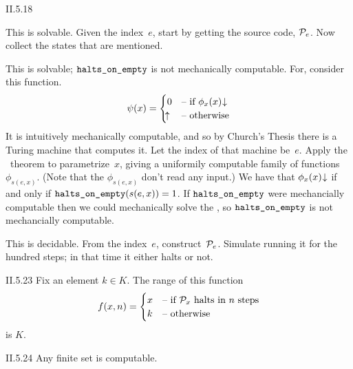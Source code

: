 \begin{ans}{II.5.18}
\begin{exparts}
\item This is solvable.
Given the index~$e$, start by getting the source code, $\mathcal{P}_e$.
Now collect the states that are mentioned.
\item This is solvable; $\operatorname{\texttt{halts\_on\_empty}}$
is not mechanically computable.
For, consider this function.
\begin{equation*}
  \psi(x)=
  \begin{cases}
    0          &\case{if $\phi_x(x)\converges$} \\
    \diverges &\case{otherwise}
  \end{cases}
\end{equation*}
It is intuitively mechanically computable, and so by Church's Thesis
there is a Turing machine that computes it.
Let the index of that machine be~$e$.
Apply the \smn~theorem to parametrize~$x$,
giving a uniformily computable family of functions~$\phi_{s(e,x)}$.
(Note that the $\phi_{s(e,x)}$ don't read any input.)
We have that $\phi_x(x)\converges$ if and only if
$\operatorname{\texttt{halts\_on\_empty}}(s(e,x))=1$.
If $\operatorname{\texttt{halts\_on\_empty}}$ were mechancially computable
then we could mechanically solve the \HP,
so $\operatorname{\texttt{halts\_on\_empty}}$ is not mechancially computable.
\item This is decidable.
From the index~$e$, construct~$\mathcal{P}_e$.
Simulate running it for the hundred steps; in that time it either halts
or not.
\end{exparts}
\end{ans}
%
%
%
%
%
\begin{ans}{II.5.23}
Fix an element $k\in K$.
The range of this function
\begin{equation*}
  f(x,n)=
  \begin{cases}
  x  &\text{-- if $\mathcal{P}_x$ halts in $n$ steps}  \\
  k  &\text{-- otherwise}
  \end{cases}
\end{equation*}
is $K$.
\end{ans}
%
\begin{ans}{II.5.24}
Any finite set is computable.
\end{ans}
%
